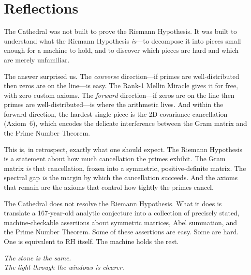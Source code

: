\documentclass[11pt,a4paper]{article}
\begin{document}
\section{Reflections}
\label{sec:reflections}

The Cathedral was not built to prove the Riemann Hypothesis. It was built
to understand what the Riemann Hypothesis \emph{is}---to decompose it
into pieces small enough for a machine to hold, and to discover which
pieces are hard and which are merely unfamiliar.

The answer surprised us. The \emph{converse} direction---if primes are
well-distributed then zeros are on the line---is easy. The Rank-1 Mellin
Miracle gives it for free, with zero custom axioms. The \emph{forward}
direction---if zeros are on the line then primes are well-distributed---is
where the arithmetic lives. And within the forward direction, the
hardest single piece is the 2D covariance cancellation
(Axiom~6), which encodes the delicate interference between the Gram
matrix and the Prime Number Theorem.

This is, in retrospect, exactly what one should expect. The Riemann
Hypothesis is a statement about how much cancellation the primes exhibit.
The Gram matrix \emph{is} that cancellation, frozen into a symmetric,
positive-definite matrix. The spectral gap \emph{is} the margin by which
the cancellation succeeds. And the axioms that remain are the axioms
that control how tightly the primes cancel.

The Cathedral does not resolve the Riemann Hypothesis. What it does is
translate a 167-year-old analytic conjecture into a collection of
precisely stated, machine-checkable assertions about symmetric matrices,
Abel summation, and the Prime Number Theorem. Some of these assertions
are easy. Some are hard. One is equivalent to RH itself. The machine
holds the rest.

\begin{flushright}
\emph{The stone is the same.\\
The light through the windows is clearer.}
\end{flushright}
\end{document}
